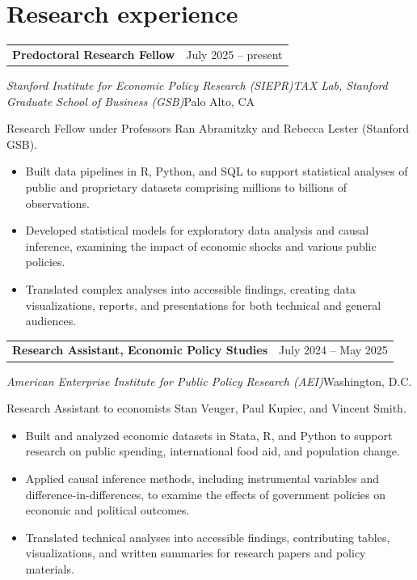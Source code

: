 \documentclass[10pt,letterpaper]{article}
\begin{document}
\section*{Research experience}
\begin{tabularx}{\linewidth}{@{}X r@{}}\textbf{Predoctoral Research Fellow} & {\small July 2025 -- present}\\\end{tabularx}
\emph{Stanford Institute for Economic Policy Research (SIEPR)\newline{}TAX Lab, Stanford Graduate School of Business (GSB)}\hfill {\small\color{muted}Palo Alto, CA}\par
Research Fellow under Professors Ran Abramitzky and Rebecca Lester (Stanford GSB).\par
\begin{itemize}
\item Built data pipelines in R, Python, and SQL to support statistical analyses of public and proprietary datasets comprising millions to billions of observations.
\item Developed statistical models for exploratory data analysis and causal inference, examining the impact of economic shocks and various public policies.
\item Translated complex analyses into accessible findings, creating data visualizations, reports, and presentations for both technical and general audiences.
\end{itemize}
\vspace{4pt}
\begin{tabularx}{\linewidth}{@{}X r@{}}\textbf{Research Assistant, Economic Policy Studies} & {\small July 2024 -- May 2025}\\\end{tabularx}
\emph{American Enterprise Institute for Public Policy Research (AEI)}\hfill {\small\color{muted}Washington, D.C.}\par
Research Assistant to economists Stan Veuger, Paul Kupiec, and Vincent Smith.\par
\begin{itemize}
\item Built and analyzed economic datasets in Stata, R, and Python to support research on public spending, international food aid, and population change.
\item Applied causal inference methods, including instrumental variables and difference-in-differences, to examine the effects of government policies on economic and political outcomes.
\item Translated technical analyses into accessible findings, contributing tables, visualizations, and written summaries for research papers and policy materials.
\end{itemize}
\end{document}
